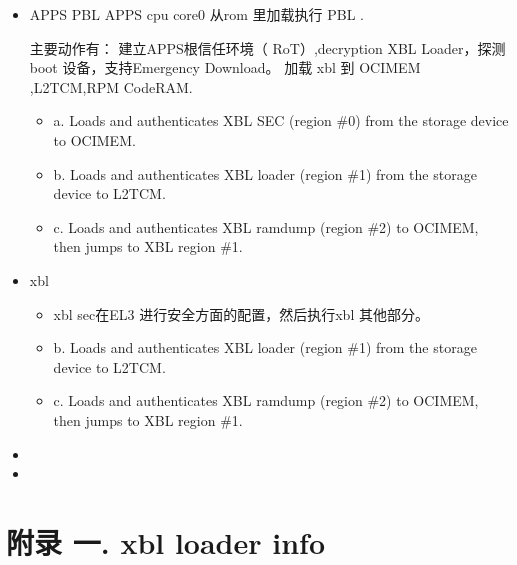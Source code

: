 \begin{itemize}

\item APPS PBL
APPS cpu core0 从rom 里加载执行 PBL .

主要动作有： 建立APPS根信任环境（ RoT）,decryption  XBL Loader，探测boot 设备，支持Emergency Download。
加载 xbl 到 OCIMEM ,L2TCM,RPM CodeRAM.

\begin{itemize}
\item a. Loads and authenticates XBL SEC (region \#0) from the storage device to OCIMEM.
\item  b. Loads and authenticates XBL loader (region \#1) from the storage device to L2TCM.
\item c. Loads and authenticates XBL ramdump (region \#2) to OCIMEM, then jumps to XBL region \#1.
\end{itemize}

\item xbl

\begin{itemize}
\item xbl sec在EL3 进行安全方面的配置，然后执行xbl 其他部分。
\item  b. Loads and authenticates XBL loader (region \#1) from the storage device to L2TCM.
\item c. Loads and authenticates XBL ramdump (region \#2) to OCIMEM, then jumps to XBL region \#1.
\end{itemize}


\item  

\item 

\end{itemize}




\section{附录 一. xbl loader info\label{loaderinfo}}



